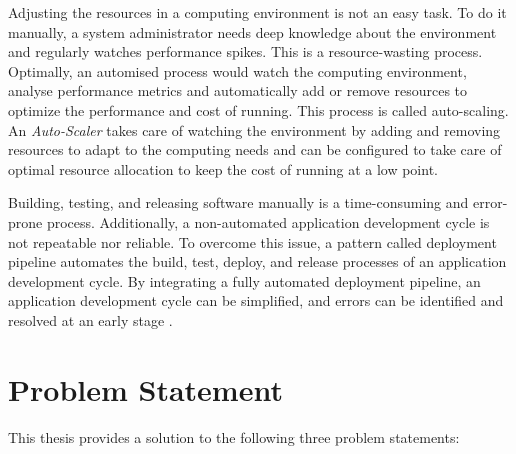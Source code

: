 Adjusting the resources in a computing environment is not an easy task. To do it manually, a system administrator needs deep knowledge about the environment and regularly watches performance spikes. This is a resource-wasting process. Optimally, an automised process would watch the computing environment, analyse performance metrics and automatically add or remove resources to optimize the performance and cost of running. This process is called auto-scaling.
An \textit{Auto-Scaler} takes care of watching the environment by adding and removing resources to adapt to the computing needs and can be configured to take care of optimal resource allocation to keep the cost of running at a low point.


Building, testing, and releasing software manually is a time-consuming and error-prone process. Additionally, a non-automated application development cycle is not repeatable nor reliable.
To overcome this issue, a pattern called deployment pipeline automates the build, test, deploy, and release processes of an application development cycle.
By integrating a fully automated deployment pipeline, an application development cycle can be simplified, and errors can be identified and resolved at an early stage \cite{Farley2010CI}.


\section{Problem Statement}
\label{sec:01_introduction_problem}
This thesis provides a solution to the following three problem statements:

